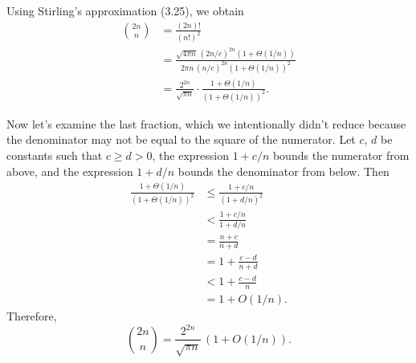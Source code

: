 \starred
Using Stirling's approximation (3.25), we obtain
\begin{align*}
    \binom{2n}{n} &= \frac{(2n)!}{(n!)^2} \\
    &= \frac{\sqrt{4\pi n}\,(2n/e)^{2n}(1+\Theta(1/n))}{2\pi n\,(n/e)^{2n}(1+\Theta(1/n))^2} \\[1mm]
    &= \frac{2^{2n}}{\sqrt{\pi n}}\cdot\frac{1+\Theta(1/n)}{(1+\Theta(1/n))^2}.
\end{align*}

Now let's examine the last fraction, which we intentionally didn't reduce because the denominator may not be equal to the square of the numerator.
Let $c$, $d$ be constants such that $c\ge d>0$, the expression $1+c/n$ bounds the numerator from above, and the expression $1+d/n$ bounds the denominator from below.
Then
\begin{align*}
    \frac{1+\Theta(1/n)}{(1+\Theta(1/n))^2} &\le \frac{1+c/n}{(1+d/n)^2} \\[1mm]
    &< \frac{1+c/n}{1+d/n} \\[1mm]
    &= \frac{n+c}{n+d} \\
    &= 1+\frac{c-d}{n+d} \\[1mm]
    &< 1+\frac{c-d}{n} \\[1mm]
    &= 1+O(1/n).
\end{align*}
Therefore,
\[
    \binom{2n}{n} = \frac{2^{2n}}{\sqrt{\pi n}}\,(1+O(1/n)).
\]
